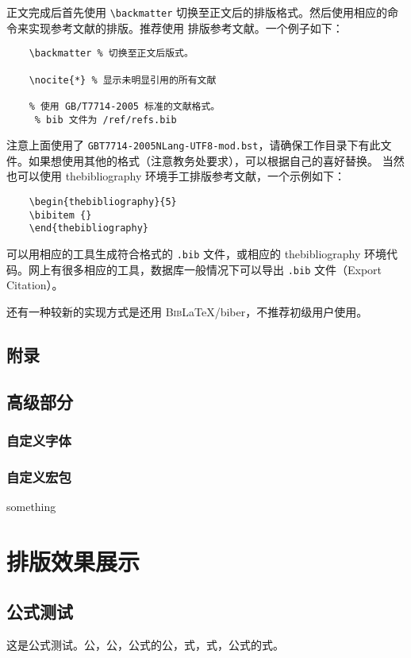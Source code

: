 \documentclass[%
               amsthm,
              ]{xjtubsc}
\begin{document}
正文完成后首先使用 \verb|\backmatter| 切换至正文后的排版格式。然后使用相应的命令来实现参考文献的排版。推荐使用  排版参考文献。一个例子如下：
\begin{verbatim}
    \backmatter % 切换至正文后版式。

    \nocite{*} % 显示未明显引用的所有文献
     
    % 使用 GB/T7714-2005 标准的文献格式。
     % bib 文件为 /ref/refs.bib
\end{verbatim}
注意上面使用了 \verb|GBT7714-2005NLang-UTF8-mod.bst|，请确保工作目录下有此文件。如果想使用其他的格式（注意教务处要求），可以根据自己的喜好替换。
当然也可以使用 thebibliography 环境手工排版参考文献，一个示例如下：
\begin{verbatim}
    \begin{thebibliography}{5}
    \bibitem {}
    \end{thebibliography}
\end{verbatim}

可以用相应的工具生成符合格式的 \verb|.bib| 文件，或相应的 thebibliography 环境代码。网上有很多相应的工具，数据库一般情况下可以导出 \verb|.bib| 文件（Export Citation）。

还有一种较新的实现方式是还用 \textsc{Bib}\LaTeX{}/biber，不推荐初级用户使用。
\subsection{附录}

\subsection{高级部分}

\subsubsection{自定义字体}\label{sec:customfont}
\subsubsection{自定义宏包}
something

\section{排版效果展示}

\subsection{公式测试}
这是公式测试。公，公，公式的公，式，式，公式的式。
\end{document}
